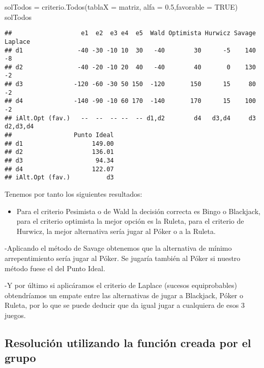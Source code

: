 \documentclass[
]{article}
\newenvironment{Shaded}{\begin{snugshade}}{\end{snugshade}}
\newcommand{\AttributeTok}[1]{\textcolor[rgb]{0.77,0.63,0.00}{#1}}
\newcommand{\ConstantTok}[1]{\textcolor[rgb]{0.00,0.00,0.00}{#1}}
\newcommand{\FloatTok}[1]{\textcolor[rgb]{0.00,0.00,0.81}{#1}}
\newcommand{\FunctionTok}[1]{\textcolor[rgb]{0.00,0.00,0.00}{#1}}
\newcommand{\NormalTok}[1]{#1}
\newcommand{\OtherTok}[1]{\textcolor[rgb]{0.56,0.35,0.01}{#1}}
\providecommand{\tightlist}{%
  \setlength{\itemsep}{0pt}\setlength{\parskip}{0pt}}
\begin{document}
\begin{Shaded}
\begin{Highlighting}[]
\NormalTok{solTodos }\OtherTok{=} \FunctionTok{criterio.Todos}\NormalTok{(}\AttributeTok{tablaX =}\NormalTok{ matriz, }\AttributeTok{alfa =} \FloatTok{0.5}\NormalTok{,}\AttributeTok{favorable =} \ConstantTok{TRUE}\NormalTok{)}
\NormalTok{solTodos}
\end{Highlighting}
\end{Shaded}

\begin{verbatim}
##                   e1  e2  e3 e4  e5  Wald Optimista Hurwicz Savage  Laplace
## d1               -40 -30 -10 10  30   -40        30      -5    140       -8
## d2               -40 -20 -10 20  40   -40        40       0    130       -2
## d3              -120 -60 -30 50 150  -120       150      15     80       -2
## d4              -140 -90 -10 60 170  -140       170      15    100       -2
## iAlt.Opt (fav.)   --  --  -- --  -- d1,d2        d4   d3,d4     d3 d2,d3,d4
##                 Punto Ideal
## d1                   149.00
## d2                   136.01
## d3                    94.34
## d4                   122.07
## iAlt.Opt (fav.)          d3
\end{verbatim}

Tenemos por tanto los siguientes resultados:

\begin{itemize}
\tightlist
\item
  Para el criterio Pesimista o de Wald la decisión correcta es Bingo o
  Blackjack, para el criterio optimista la mejor opción es la Ruleta,
  para el criterio de Hurwicz, la mejor alternativa sería jugar al Póker
  o a la Ruleta.
\end{itemize}

-Aplicando el método de Savage obtenemos que la alternativa de mínimo
arrepentimiento sería jugar al Póker. Se jugaría también al Póker si
nuestro método fuese el del Punto Ideal.

-Y por último si aplicáramos el criterio de Laplace (sucesos
equiprobables) obtendríamos un empate entre las alternativas de jugar a
Blackjack, Póker o Ruleta, por lo que se puede deducir que da igual
jugar a cualquiera de esos 3 juegos.

\hypertarget{resoluciuxf3n-utilizando-la-funciuxf3n-creada-por-el-grupo}{%
\subsection{Resolución utilizando la función creada por el
grupo}\label{resoluciuxf3n-utilizando-la-funciuxf3n-creada-por-el-grupo}}
\end{document}
